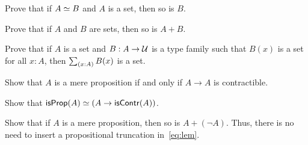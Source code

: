 \documentclass[hott-all.tex]{subfiles}
\begin{document}
%

%
\begin{ex}
  Prove that if $A \simeq B$ and $A$ is a set, then so is $B$.
\end{ex}

\begin{ex}
  Prove that if $A$ and $B$ are sets, then so is $A+B$.
\end{ex}

\begin{ex}
  Prove that if $A$ is a set and $B:A\to \mathcal{U}$ is a type family such that $B(x)$ is a set for all $x:A$, then $\sm{x:A} B(x)$ is a set.
\end{ex}

\begin{ex}
  Show that $A$ is a mere proposition if and only if $A\to A$ is contractible.
\end{ex}

\begin{ex}
  Show that $\mathsf{isProp}(A) \simeq (A\to\mathsf{isContr}(A))$.
\end{ex}

\begin{ex}
  Show that if $A$ is a mere proposition, then so is $A+(\neg A)$.
  Thus, there is no need to insert a propositional truncation in~\eqref{eq:lem}.
\end{ex}
\end{document}
